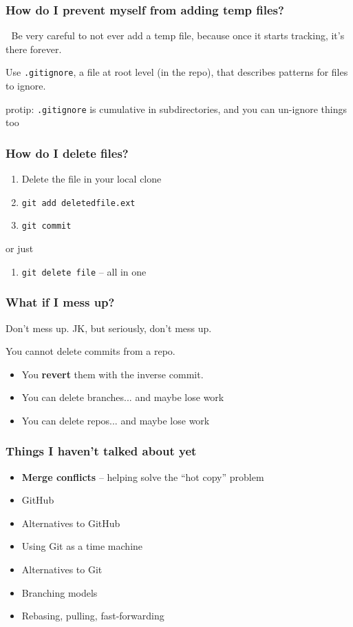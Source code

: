 \documentclass[14pt,aspectratio=1610]{beamer} %
\newcommand{\fframe}[2]{
   \begin{frame}
\frametitle{#1}
#2
\end{frame}
}
\begin{document}
\fframe{How do I prevent myself from adding temp files?}
{
	🔴 Be very careful to not ever add a temp file, because once it starts tracking, it's there forever.  

\vspace{\baselineskip}
	Use {\tt .gitignore}, a file at root level (in the repo), that describes patterns for files to ignore.

\vfill
	protip: {\tt .gitignore} is cumulative in subdirectories, and you can un-ignore things too
}


\fframe{How do I delete files?}
{
	\begin{enumerate}
		\item Delete the file in your local clone
		\item {\tt git add deletedfile.ext}
		\item {\tt git commit}
	\end{enumerate}

	or just

	\begin{enumerate}
		\item {\tt git delete file} -- all in one
	\end{enumerate}
}


\fframe{What if I mess up?}
{
	Don't mess up.   JK, but seriously, don't mess up.

\vspace{\baselineskip}

	You cannot delete commits from a repo.  
	\begin{itemize}
		\item You {\bf revert} them with the inverse commit.   
		\item You can delete branches... and maybe lose work
		\item You can delete repos... and maybe lose work
	\end{itemize}
}









\fframe{Things I haven't talked about yet}
{
	\begin{itemize}
		\item {\bf Merge conflicts} -- helping solve the ``hot copy'' problem
		\item GitHub
		\item Alternatives to GitHub
		\item Using Git as a time machine
		\item Alternatives to Git
		\item Branching models
		\item Rebasing, pulling, fast-forwarding
	\end{itemize}
}
\end{document}
